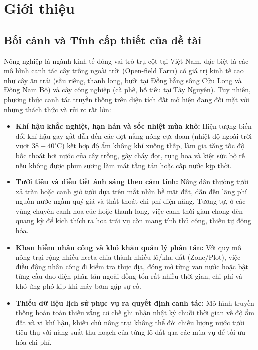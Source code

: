 \section{Giới thiệu}

\subsection{Bối cảnh và Tính cấp thiết của đề tài}

Nông nghiệp là ngành kinh tế đóng vai trò trụ cột tại Việt Nam, đặc biệt là các mô hình canh tác cây trồng ngoài trời (Open-field Farm) có giá trị kinh tế cao như cây ăn trái (sầu riêng, thanh long, bưởi tại Đồng bằng sông Cửu Long và Đông Nam Bộ) và cây công nghiệp (cà phê, hồ tiêu tại Tây Nguyên). Tuy nhiên, phương thức canh tác truyền thống trên diện tích đất mở hiện đang đối mặt với những thách thức và rủi ro rất lớn:
\begin{itemize}
    \item \textbf{Khí hậu khắc nghiệt, hạn hán và sốc nhiệt mùa khô:} Hiện tượng biến đổi khí hậu gay gắt dẫn đến các đợt nắng nóng cực đoan (nhiệt độ ngoài trời vượt $38 - 40^\circ\text{C}$) kết hợp độ ẩm không khí xuống thấp, làm gia tăng tốc độ bốc thoát hơi nước của cây trồng, gây cháy đọt, rụng hoa và kiệt sức bộ rễ nếu không được phun sương làm mát tầng tán hoặc cấp nước kịp thời.
    \item \textbf{Tưới tiêu và điều tiết ánh sáng theo cảm tính:} Nông dân thường tưới xả tràn hoặc canh giờ tưới dựa trên mắt nhìn bề mặt đất, dẫn đến lãng phí nguồn nước ngầm quý giá và thất thoát chi phí điện năng. Tương tự, ở các vùng chuyên canh hoa cúc hoặc thanh long, việc canh thời gian chong đèn quang kỳ để kích thích ra hoa trái vụ còn mang tính thủ công, thiếu tự động hóa.
    \item \textbf{Khan hiếm nhân công và khó khăn quản lý phân tán:} Với quy mô nông trại rộng nhiều hecta chia thành nhiều lô/khu đất (Zone/Plot), việc điều động nhân công đi kiểm tra thực địa, đóng mở từng van nước hoặc bật từng cầu dao điện phân tán ngoài đồng tốn rất nhiều thời gian, chi phí và khó ứng phó kịp khi máy bơm gặp sự cố.
    \item \textbf{Thiếu dữ liệu lịch sử phục vụ ra quyết định canh tác:} Mô hình truyền thống hoàn toàn thiếu vắng cơ chế ghi nhận nhật ký chuỗi thời gian về độ ẩm đất và vi khí hậu, khiến chủ nông trại không thể đối chiếu lượng nước tưới tiêu thụ với năng suất thu hoạch của từng lô đất qua các mùa vụ để tối ưu hóa chi phí.
\end{itemize}

